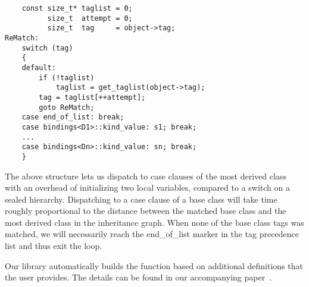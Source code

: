 \begin{lstlisting}
    const size_t* taglist = 0;
          size_t  attempt = 0;
          size_t  tag     = object->tag;
ReMatch:
    switch (tag) 
    {
    default:
        if (!taglist) 
            taglist = get_taglist(object->tag);
        tag = taglist[++attempt];
        goto ReMatch;
    case end_of_list: break;
    case bindings<D1>::kind_value: s1; break;
    ...
    case bindings<Dn>::kind_value: sn; break;
    }
\end{lstlisting}

\noindent
The above structure lets us dispatch to case clauses of the most derived class 
with an overhead of initializing two local variables, compared to a switch on a 
sealed hierarchy. Dispatching to a case clause of a base class will take time 
roughly proportional to the distance between the matched base class and the most 
derived class in the inheritance graph. When none of the base class tags was 
matched, we will necessarily reach the end\_of\_list marker in the tag precedence 
list and thus exit the loop.

Our library automatically builds the function  based on 
additional definitions that the user provides. The details can be found in our 
accompanying paper~\cite{AP}.
